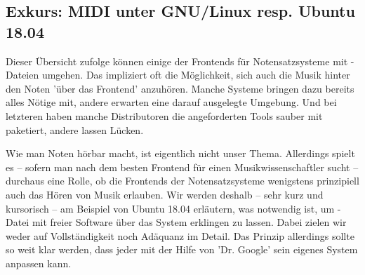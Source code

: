 %
%
%




\subsection{Exkurs: MIDI unter GNU/Linux resp. Ubuntu 18.04}

Dieser Übersicht zufolge können einige der Frontends für Notensatzsysteme mit
-Dateien umgehen. Das impliziert oft die Möglichkeit, sich auch die
Musik hinter den Noten 'über das Frontend' anzuhören. Manche Systeme bringen dazu
bereits alles Nötige mit, andere erwarten eine darauf ausgelegte Umgebung. Und
bei letzteren haben manche Distributoren die angeforderten Tools sauber mit
paketiert, andere lassen Lücken.

Wie man Noten hörbar macht, ist eigentlich nicht unser Thema. Allerdings
spielt es -- sofern man nach dem besten Frontend für einen Musikwissenschaftler
sucht -- durchaus eine Rolle, ob die Frontends der Notensatzsysteme wenigstens
prinzipiell auch das Hören von Musik erlauben. Wir werden deshalb -- sehr kurz
und kursorisch -- am Beispiel von Ubuntu 18.04 erläutern, was notwendig ist, um
-Datei mit freier Software über das System erklingen zu lassen. Dabei
zielen wir weder auf Vollständigkeit noch Adäquanz im Detail. Das Prinzip
allerdings sollte so weit klar werden, dass jeder mit der Hilfe von 'Dr. Google'
sein eigenes System anpassen kann.

